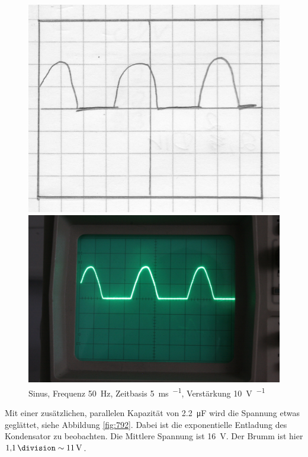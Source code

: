 \begin{figure}[htbp]
	\centering
	\begin{minipage}{.45\linewidth}
	\includegraphics[width=\linewidth]{Oszi_Hand/790.jpg}
	\end{minipage}
	\hfill
	\begin{minipage}{.45\linewidth}
	\includegraphics[width=\linewidth]{Oszi_Foto/790.jpg}
	\end{minipage}
	\caption{%
		Sinus, Frequenz \SI{50}{\hertz},
		Zeitbasis \SI{5}{\milli\second\per\division},
		Verstärkung \SI{10}{\volt\per\division}
	}
	\label{fig:790}
\end{figure}

Mit einer zusätzlichen, parallelen Kapazität von \SI{2.2}{\micro\farad} wird
die Spannung etwas geglättet, siehe Abbildung \ref{fig:792}. Dabei ist die
exponentielle Entladung des Kondensator zu beobachten. Die Mittlere Spannung
ist \SI{16}{\volt}. Der Brumm ist hier $\SI{1.1}\division \sim \SI{11}\volt$.

